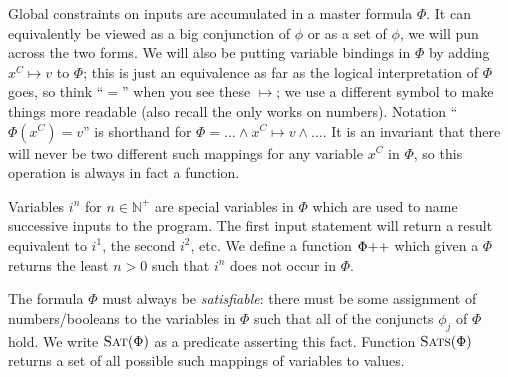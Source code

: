 Global constraints on inputs are accumulated in a master formula $\Phi$. It can equivalently be viewed as a big conjunction of $\phi$ or as a set of $\phi$, we will pun across the two forms.  We will also be putting variable bindings in $\Phi$ by adding $x^C \mapsto v$ to $\Phi$; this is just an equivalence as far as the logical interpretation of $\Phi$ goes, so think ``$=$'' when you see these $\mapsto$; we use a different symbol to make things more readable (also recall the \Fbcode{=} only works on numbers).  Notation ``$\Phi(x^C)=v$'' is shorthand for $\Phi = \dots \land x^C \mapsto v\land\dots$.  It is an invariant that there will never be two different such mappings for any variable $x^C$ in $\Phi$, so this operation is always in fact a function.

Variables $i^n$ for $n \in \mathbb N^+$ are special variables in $\Phi$ which are used to name successive inputs to the program.  The first input statement will return a result equivalent to $i^1$, the second $i^2$, etc.  We define a function $\Phi\mathnormal{+}\mathnormal{+}$ which given a $\Phi$ returns the least $n>0$ such that $i^n$ does not occur in $\Phi$.

The formula $\Phi$ must always be \emph{satisfiable}: there must be some assignment of numbers/booleans to the variables in $\Phi$ such that all of the conjuncts $\phi_j$ of $\Phi$ hold.  We write $\textsc{Sat}(\Phi)$ as a predicate asserting this fact.  Function $\textsc{Sats}(\Phi)$ returns a set of all possible such mappings of variables to values. 

